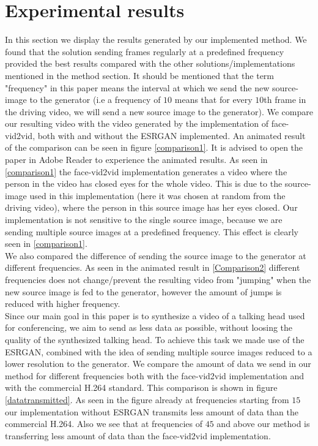 \documentclass[10pt,twocolumn,letterpaper]{article}
\begin{document}
\section{Experimental results}
In this section we display the results generated by our implemented method. We found that the solution sending frames regularly at a predefined frequency provided the best results compared with the other solutions/implementations mentioned in the method section. It should be mentioned that the term "frequency" in this paper means the interval at which we send the new source-image to the generator (i.e a frequency of $10$ means that for every $10$th frame in the driving video, we will send a new source image to the generator).  We compare our resulting video with the video generated by the implementation of face-vid2vid, both with and without the ESRGAN implemented. An animated result of the comparison can be seen in figure \ref{comparison1}. It is advised to open the paper in Adobe Reader to experience the animated results. As seen in \ref{comparison1} the face-vid2vid implementation generates a video where the person in the video has closed eyes for the whole video. This is due to the source-image used in this implementation (here it was chosen at random from the driving video), where the person in this source image has her eyes closed. Our implementation is not sensitive to the single source image, because we are sending multiple source images at a predefined frequency. This effect is clearly seen in \ref{comparison1}.   \\
We also compared the difference of sending the source image to the generator at different frequencies. As seen in the animated result in \ref{Comparison2} different frequencies does not change/prevent the resulting video from "jumping" when the new source image is fed to the generator, however the amount of jumps is reduced with higher frequency. \\

Since our main goal in this paper is to synthesize a video of a talking head used for conferencing, we aim to send as less data as possible, without loosing the quality of the synthesized talking head. To achieve this task we made use of the ESRGAN, combined with the idea of sending multiple source images reduced to a lower resolution to the generator. We compare the amount of data we send in our method for different frequencies both with the face-vid2vid implementation and with the commercial H.264 standard. This comparison is shown in figure \ref{datatransmitted}. As seen in the figure already at frequencies starting from $15$ our implementation without ESRGAN transmits less amount of data than the commercial H.264. Also we see that at frequencies of $45$ and above our method is transferring less amount of data than the face-vid2vid \cite{Nvidia} implementation.   
\end{document}
